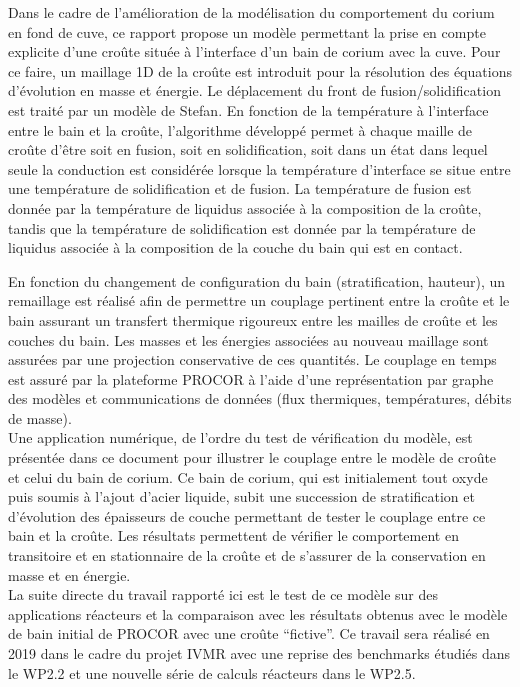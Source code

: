 Dans le cadre de l'amélioration de la modélisation du comportement du corium en fond de cuve, ce rapport propose un modèle permettant la prise en compte explicite d'une croûte située à l'interface d'un bain de corium avec la cuve. Pour ce faire, un maillage 1D de la croûte est introduit pour la résolution des équations d'évolution en masse et énergie. Le déplacement du front de fusion/solidification est traité par un modèle de Stefan. En fonction de la température à l'interface entre le bain et la croûte, l'algorithme développé permet à chaque maille de croûte d'être soit en fusion, soit en solidification, soit dans un état dans lequel seule la conduction est considérée lorsque la température d'interface se situe entre une température de solidification et de fusion. La température de fusion est donnée par la température de liquidus associée à la composition de la croûte, tandis que la température de solidification est donnée par la température de liquidus associée à la composition de la couche du bain qui est en contact. 

En fonction du changement de configuration du bain (stratification, hauteur), un remaillage est réalisé afin de permettre un couplage pertinent entre la croûte et le bain assurant un transfert thermique rigoureux entre les mailles de croûte et les couches du bain. Les masses et les énergies associées au nouveau maillage sont assurées par une projection conservative de ces quantités. Le couplage en temps est assuré par la plateforme PROCOR à l'aide d'une représentation par graphe des modèles et communications de données (flux thermiques, températures, débits de masse).\\

Une application numérique, de l'ordre du test de vérification du modèle, est présentée dans ce document pour illustrer le couplage entre le modèle de croûte et celui du bain de corium. Ce bain de corium, qui est initialement tout oxyde puis soumis à l'ajout d'acier liquide, subit une succession de stratification et d'évolution des épaisseurs de couche permettant de tester le couplage entre ce bain et la croûte. Les résultats permettent de vérifier le comportement en transitoire et en stationnaire de la croûte et de s'assurer de la conservation en masse et en énergie.\\

La suite directe du travail rapporté ici est le test de ce modèle sur des applications réacteurs et la comparaison avec les résultats obtenus avec le modèle de bain initial de PROCOR avec une croûte ``fictive''. Ce travail sera réalisé en 2019 dans le cadre du projet IVMR avec une reprise des benchmarks étudiés dans le WP2.2 et une nouvelle série de calculs réacteurs dans le WP2.5.

